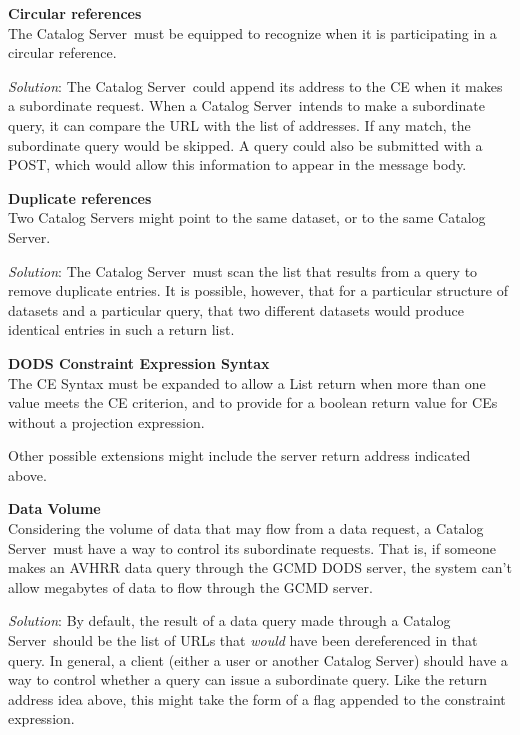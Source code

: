 \documentclass[10pt]{report}
\newcommand{\cs}{Catalog Server}
\begin{document}
\begin{description}
\item{\bf Circular references}\\The \cs\ must be equipped to recognize
  when it is participating in a circular reference. 
  
  \textit{Solution}: The \cs\ could append its address to the CE when
  it makes a subordinate request.  When a \cs\ intends to make a
  subordinate query, it can compare the URL with the list of
  addresses.  If any match, the subordinate query would be skipped.  A
  query could also be submitted with a POST, which would allow this
  information to appear in the message body.
\item{\bf Duplicate references}\\Two \cs s might point to the same
  dataset, or to the same \cs .
  
  \textit{Solution}: The \cs\ must scan the list that results from a
  query to remove duplicate entries.  It is possible, however, that
  for a particular structure of datasets and a particular query, that
  two different datasets would produce identical entries in such a
  return list.
\item{\bf DODS Constraint Expression Syntax}\\The CE Syntax must be
  expanded to allow a List return when more than one value meets the
  CE criterion, and to provide for a boolean return value for CEs
  without a projection expression.

  Other possible extensions might include the server return address
  indicated above.
\item{\bf Data Volume}\\Considering the volume of data that may flow
  from a data request, a \cs\ must have a way to control its
  subordinate requests.  That is, if someone makes an AVHRR data query
  through the GCMD DODS server, the system can't allow megabytes of
  data to flow through the GCMD server.
  
  \textit{Solution}: By default, the result of a data query made
  through a \cs\ should be the list of URLs that \emph{would} have
  been dereferenced in that query.  In general, a client (either a
  user or another \cs ) should have a way to control whether a query
  can issue a subordinate query.  Like the return address idea above,
  this might take the form of a flag appended to the constraint
  expression.
\end{description}

\cbend
\end{document}
